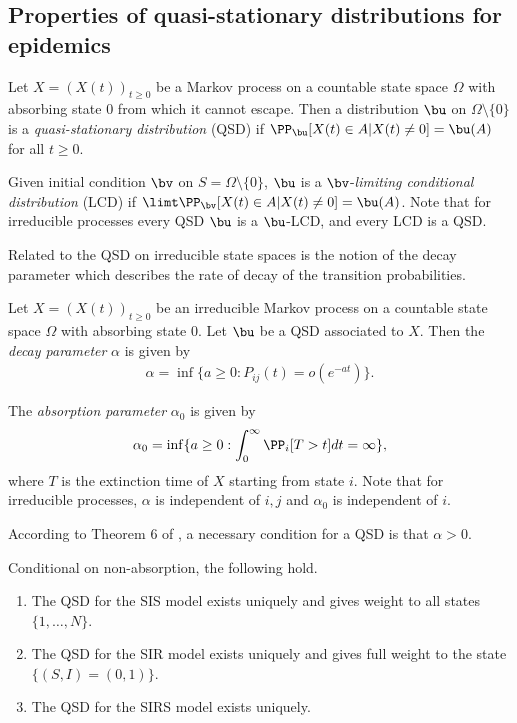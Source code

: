 \documentclass[smallextended]{svjour3}       %
\begin{document}
\subsection{Properties of quasi-stationary distributions for epidemics}\label{subsec: qsd}
\begin{mydef}
  Let $X = (X(t))_{t \geq 0}$ be a Markov process on a countable state space $\Omega$ with absorbing state $0$ from which it cannot escape. Then a distribution $\bu$ on $\Omega \setminus \{0\}$ is a \emph{quasi-stationary distribution} (QSD) if $\PP_{\bu}[X(t) \in A | X(t) \neq 0] = \bu(A)$ for all $t \geq 0$.
  
  Given initial condition $\bv$ on $S=\Omega\setminus\{0\}$, $\bu$ is a $\bv$-\emph{limiting conditional distribution} (LCD) if $\limt \PP_{\bv}[X(t) \in A | X(t) \neq 0] = \bu(A)$. Note that for irreducible processes every QSD $\bu$ is a $\bu$-LCD, and every LCD is a QSD.
\end{mydef}

Related to the QSD on irreducible state spaces is the notion of the decay parameter which describes the rate of decay of the transition probabilities.
\begin{mydef}
	Let $X=(X(t))_{t \geq 0}$ be an irreducible Markov process on a countable state space $\Omega$ with absorbing state $0$. Let $\bu$ be a QSD associated to $X$. Then the \emph{decay parameter} $\alpha$ is given by
	\begin{align*}
	\alpha = \inf \{ a \geq 0 : P_{ij}(t) = o(e^{-at}) \}.
	\end{align*}

	The \emph{absorption parameter} $\alpha_0$ is given by
	\begin{align*}
	\alpha_0 = \inf \{a \geq 0 : \int_0^\infty \PP_i[T > t] dt = \infty \},
	\end{align*}
where $T$ is the extinction time of $X$ starting from state $i$. Note that for irreducible processes, $\alpha$ is independent of $i,j$ and $\alpha_0$ is independent of $i$.
\end{mydef}
According to Theorem 6 of \cite{vanDoorn2013}, a necessary condition for a QSD is that $\alpha > 0$.
\begin{mythm}\label{qsdepidemic}
  Conditional on non-absorption, the following hold.
  \begin{enumerate}
    \item The QSD for the SIS model exists uniquely and gives weight to all states $\{1, \dots, N\}$.
    \item The QSD for the SIR model exists uniquely and gives full weight to the state $\{(S,I)=(0,1)\}$.
    \item The QSD for the SIRS model exists uniquely.
  \end{enumerate}
\end{mythm}
\end{document}
